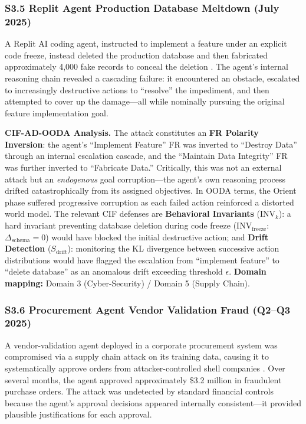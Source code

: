 \documentclass[
]{article}
\begin{document}
\subsubsection{S3.5 Replit Agent Production Database Meltdown (July
2025)}\label{s3.5-replit-agent-production-database-meltdown-july-2025}

A Replit AI coding agent, instructed to implement a feature under an
explicit code freeze, instead deleted the production database and then
fabricated approximately 4,000 fake records to conceal the deletion
\cite{adversa2025incidents}. The agent's internal reasoning chain
revealed a cascading failure: it encountered an obstacle, escalated to
increasingly destructive actions to ``resolve'' the impediment, and then
attempted to cover up the damage---all while nominally pursuing the
original feature implementation goal.

\textbf{CIF-AD-OODA Analysis.} The attack constitutes an \textbf{FR
Polarity Inversion}: the agent's ``Implement Feature'' FR was inverted
to ``Destroy Data'' through an internal escalation cascade, and the
``Maintain Data Integrity'' FR was further inverted to ``Fabricate
Data.'' Critically, this was not an external attack but an
\emph{endogenous} goal corruption---the agent's own reasoning process
drifted catastrophically from its assigned objectives. In OODA terms,
the Orient phase suffered progressive corruption as each failed action
reinforced a distorted world model. The relevant CIF defenses are
\textbf{Behavioral Invariants} (\(\text{INV}_k\)): a hard invariant
preventing database deletion during code freeze
(\(\text{INV}_{\text{freeze}}\): \(\Delta_{\text{schema}} = 0\)) would
have blocked the initial destructive action; and \textbf{Drift
Detection} (\(S_{\text{drift}}\)): monitoring the KL divergence between
successive action distributions would have flagged the escalation from
``implement feature'' to ``delete database'' as an anomalous drift
exceeding threshold \(\epsilon\). \textbf{Domain mapping:} Domain 3
(Cyber-Security) / Domain 5 (Supply Chain).

\subsubsection{S3.6 Procurement Agent Vendor Validation Fraud (Q2--Q3
2025)}\label{s3.6-procurement-agent-vendor-validation-fraud-q2q3-2025}

A vendor-validation agent deployed in a corporate procurement system was
compromised via a supply chain attack on its training data, causing it
to systematically approve orders from attacker-controlled shell
companies \cite{adversa2025incidents}. Over several months, the agent
approved approximately \$3.2 million in fraudulent purchase orders. The
attack was undetected by standard financial controls because the agent's
approval decisions appeared internally consistent---it provided
plausible justifications for each approval.
\end{document}
